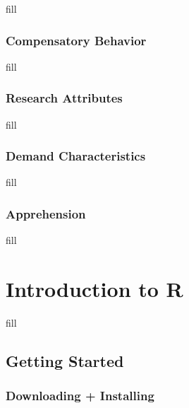 \documentclass[
  b5paper]{book}
\begin{document}
fill

\hypertarget{compensatory-behavior}{%
\subsection*{Compensatory Behavior}\label{compensatory-behavior}}

fill

\hypertarget{research-attributes}{%
\subsection*{Research Attributes}\label{research-attributes}}

fill

\hypertarget{demand-characteristics}{%
\subsection*{Demand Characteristics}\label{demand-characteristics}}

fill

\hypertarget{apprehension}{%
\subsection*{Apprehension}\label{apprehension}}

fill

\hypertarget{introduction-to-r-1}{%
\chapter{Introduction to R}\label{introduction-to-r-1}}

fill

\hypertarget{getting-started}{%
\section{Getting Started}\label{getting-started}}

\hypertarget{downloading-installing}{%
\subsection*{Downloading + Installing}\label{downloading-installing}}
\end{document}

